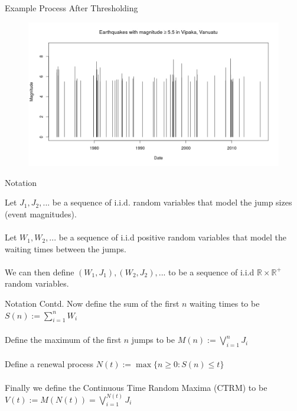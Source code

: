 \documentclass{beamer}
\begin{document}
\begin{frame}{Example Process After Thresholding}
    \begin{figure}
        \hspace{-0.8cm}
        \includegraphics[scale=0.45]{ThresholdedEQData.jpeg}
    \end{figure}
\end{frame}
 
\begin{frame}{Notation}
	
	Let $J_1 , J_2 , ...$ be a sequence of i.i.d. random variables that model the jump sizes (event magnitudes).
	\\~\\
	Let $W_1, W_2, ...$ be a sequence of i.i.d positive random variables that model the waiting times between the jumps.
	\\~\\
	We can then define $(W_1 , J_1 ), (W_2 , J_2 ), ...$ to be a sequence of i.i.d $\mathbb{R} \times \mathbb{R} ^+$ random variables.
\end{frame}

\begin{frame}{Notation Contd.}
    Now define the sum of the first $n$ waiting times to be $S(n):=\sum^n_{i=1} W_i$
    \\~\\
    Define the maximum of the first $n$ jumps to be $M(n):=\bigvee_{i=1}^n J_i$
    \\~\\
    Define a renewal process $N(t):=\max\{n\geq0:S(n)\leq t\}$
    \\~\\
    Finally we define the Continuous Time Random Maxima (CTRM) to be $V(t):=M(N(t))=\bigvee_{i=1}^{N(t)} J_i$
\end{frame}
\end{document}
